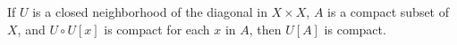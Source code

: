 If $U$ is a closed neighborhood of the diagonal in $X \times X$, $A$ is a compact subset of $X$, and $U \circ U[x]$ is compact for each $x$ in $A$, then $U[A]$ is compact.
